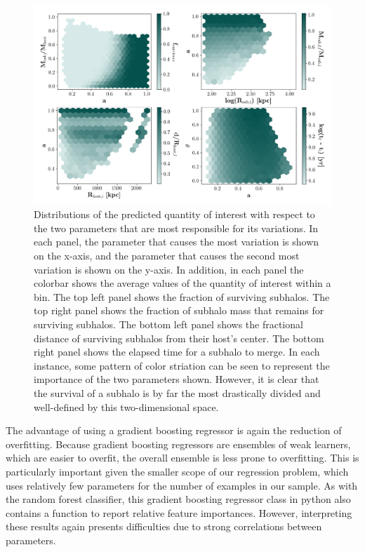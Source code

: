\documentclass[fleqn,usenatbib]{mnras}
\begin{document}
\begin{figure}
	\includegraphics[width=\textwidth]{Figures/bestSpaces}
	\vspace{-15pt}
    \caption{Distributions of the predicted quantity of interest with respect to the two parameters that are most responsible for its variations. In each panel, the parameter that causes the most variation is shown on the x-axis, and the parameter that causes the second most variation is shown on the y-axis. In addition, in each panel the colorbar shows the average values of the quantity of interest within a bin. The top left panel shows the fraction of surviving subhalos. The top right panel shows the fraction of subhalo mass that remains for surviving subhalos. The bottom left panel shows the fractional distance of surviving subhalos from their host's center. The bottom right panel shows the elapsed time for a subhalo to merge. In each instance, some pattern of color striation can be seen to represent the importance of the two parameters shown. However, it is clear that the survival of a subhalo is by far the most drastically divided and well-defined by this two-dimensional space. }
    \label{fig:bestSpaces}
\end{figure}


The advantage of using a gradient boosting regressor is again the reduction of overfitting. Because gradient boosting regressors are ensembles of weak learners, which are easier to overfit, the overall ensemble is less prone to overfitting. This is particularly important given the smaller scope of our regression problem, which uses relatively few parameters for the number of examples in our sample. As with the random forest classifier, this gradient boosting regressor class in python also contains a function to report relative feature importances. However, interpreting these results again presents difficulties due to strong correlations between parameters.
\end{document}
